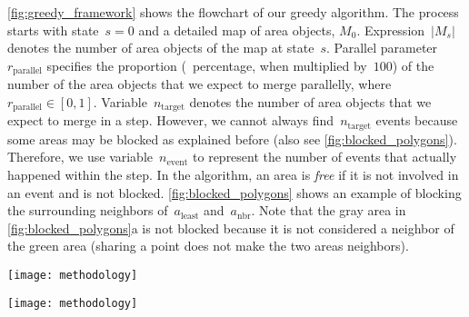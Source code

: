 \documentclass{ica}
\begin{document}
\fig\ref{fig:greedy_framework} shows the flowchart of our greedy algorithm.
The process starts with state~$s=0$ and a detailed map of area objects, $M_0$.
Expression~$|M_s|$ denotes the number of area objects of the map at state~$s$.
Parallel parameter~$r_\mathrm{parallel}$ specifies 
the proportion (\ie~percentage, when multiplied by~$100$) of the number
of the area objects that
we expect to merge parallelly,
where~$r_\mathrm{parallel} \in [0,1]$.
Variable~$n_\mathrm{target}$ denotes the number of area objects
that we expect to merge in a step.
However,
we cannot always find~$n_\mathrm{target}$ events
because some areas may be blocked as explained before
(also see \fig\ref{fig:blocked_polygons}).
Therefore, we use variable~$n_\mathrm{event}$
to represent the number of events that actually happened within the step. 
In the algorithm, an area is \emph{free} if 
it is not involved in an event and is not blocked.
\fig\ref{fig:blocked_polygons} shows an example of blocking
the surrounding neighbors of~$a_\mathrm{least}$ and~$a_\mathrm{nbr}$.
Note that the gray area in \fig\ref{fig:blocked_polygons}a is not blocked
because it is not considered a neighbor of the green area
(sharing a point does not make the two areas neighbors). 




\begin{figure*}[tb]
\centering
\texttt{[image: methodology]}
\caption{The flowchart of our greedy algorithm
    to find the merging events for all the steps.
}
\label{fig:greedy_framework}
\end{figure*}


\begin{figure*}[tb]
\centering
\texttt{[image: methodology]}
\caption{The process of finding parallel merging events for a step, 
    where parallel parameter $r_\mathrm{parallel} = 0.3$.
    (a) From all the free areas,
	the least important one is selected to merge into
	its most compatible neighbor.
	Then the surrounding areas are blocked (marked by the crosses).
	(b) Next, the least important area from the remaining free areas
	is selected to merge with the most compatible neighbor,
	and the surrounding areas are also blocked.
}
\label{fig:blocked_polygons}
\end{figure*}
\end{document}
